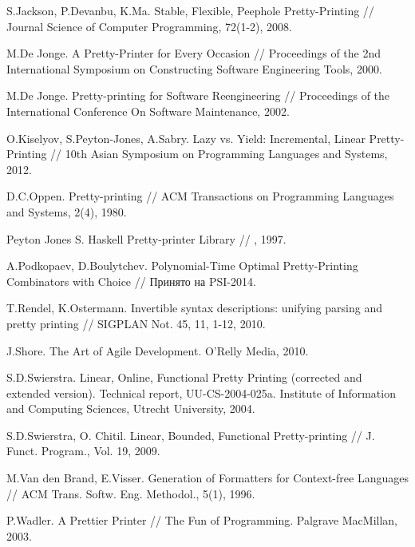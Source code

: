 \begin{thebibliography}{9001}
 S.Jackson, P.Devanbu, K.Ma. Stable, Flexible, Peephole Pretty-Printing // Journal Science of Computer Programming, 72(1-2), 2008.

 M.De Jonge. A Pretty-Printer for Every Occasion // Proceedings of the 2nd International Symposium on Constructing 
Software Engineering Tools, 2000.

 M.De Jonge. Pretty-printing for Software Reengineering // Proceedings of the International Conference On Software Maintenance, 2002.

 O.Kiselyov, S.Peyton-Jones, A.Sabry. Lazy vs. Yield: Incremental, Linear Pretty-Printing // 10th Asian Symposium on Programming Languages and Systems, 
2012.

 D.C.Oppen. Pretty-printing // ACM Transactions on Programming Languages and Systems, 2(4), 1980.

 Peyton Jones S. Haskell Pretty-printer Library // , 1997.

 A.Podkopaev, D.Boulytchev.
Polynomial-Time Optimal Pretty-Printing Combinators with Choice // Принято на PSI-2014. 

 T.Rendel, K.Ostermann. Invertible syntax descriptions: unifying parsing and pretty printing // SIGPLAN Not. 45, 11, 1-12, 2010.

 J.Shore. The Art of Agile Development. O'Relly Media, 2010.

 S.D.Swierstra. Linear, Online, Functional Pretty Printing (corrected and extended version).
Technical report, UU-CS-2004-025a. Institute of Information and Computing Sciences, Utrecht University, 2004.

 S.D.Swierstra, O. Chitil. Linear, Bounded, Functional Pretty-printing // J. Funct. Program., Vol. 19,
2009.

 M.Van den Brand, E.Visser. Generation of Formatters for Context-free Languages // ACM Trans. Softw. Eng. Methodol., 5(1), 1996.

 P.Wadler. A Prettier Printer // The Fun of Programming. Palgrave MacMillan, 2003.


\end{thebibliography}
